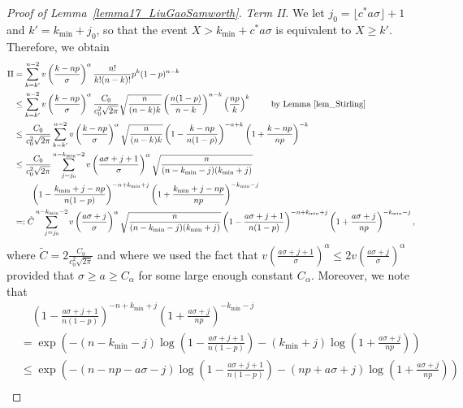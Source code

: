 \documentclass{article}
\begin{document}
\begin{proof}[Proof of Lemma~\ref{lemma17_LiuGaoSamworth}]
\textit{Term II.}
We let $j_0 = \lfloor c^* a \sigma\rfloor + 1$ and $k' = k_{\min} + j_0$, so that the event $X > k_{\min} + c^*a\sigma$ is equivalent to $X \geq k'$.
Therefore, we obtain
$$
\begin{aligned}
\text{II} &= \sum_{k = k'}^{n-2} v\left(\frac{k-np}{\sigma}\right)^\alpha \frac{n!}{k!(n-k)!} p^k (1-p)^{n-k}\\
&\leq \sum_{k = k'}^{n-2} v\left(\frac{k-np}{\sigma}\right)^\alpha \frac{C_0}{c_0^2\sqrt{2\pi}} \sqrt{\frac{n}{(n-k)k}} \left(\frac{n(1-p)}{n-k}\right)^{n-k} \left(\frac{np}{k}\right)^k\qquad \text{ by Lemma~\ref{lem_Stirling}}\\
& \leq \frac{C_0}{c_0^2\sqrt{2\pi}} \sum_{k = k'}^{n-2} v\left(\frac{k-np}{\sigma}\right)^\alpha \sqrt{\frac{n}{(n-k)k}} \left(1 - \frac{k-np}{n(1-p)}\right)^{-n+k} \left(1+ \frac{k-np}{np}\right)^{-k}\\
&\leq \frac{C_0}{c_0^2\sqrt{2\pi}} \sum_{j=j_0}^{n-k_{\min}-2} v\left(\frac{a\sigma + j + 1}{\sigma}\right)^\alpha \sqrt{\frac{n}{(n-k_{\min}-j)(k_{\min} + j)}} \\
& \qquad \left(1 - \frac{k_{\min} + j-np}{n(1-p)}\right)^{-n+k_{\min} + j} \left(1+ \frac{k_{\min} + j-np}{np}\right)^{-k_{\min} - j} \\
& =: \tilde C \sum_{j=j_0}^{n-k_{\min}-2} v\left(\frac{a\sigma + j}{\sigma}\right)^\alpha \sqrt{\frac{n}{(n-k_{\min}-j)(k_{\min} + j)}} \left(1 - \frac{a \sigma + j + 1}{n(1-p)}\right)^{-n+k_{\min} + j} \left(1+ \frac{a\sigma + j}{np}\right)^{-k_{\min} - j},
\end{aligned}
$$
where $\tilde C = 2\frac{C_0}{c_0^2\sqrt{2\pi}} $ and where we used the fact that $v\left(\frac{a\sigma + j + 1}{\sigma}\right)^\alpha  \leq 2 v\left(\frac{a\sigma + j}{\sigma}\right)^\alpha $
provided that $\sigma \geq a \geq C_\alpha$ for some large enough constant $C_\alpha$. 
Moreover, we note that
\begin{align*}
& \quad \left(1 - \frac{a \sigma + j + 1}{n(1-p)}\right)^{-n+k_{\min} + j} \left(1+ \frac{a\sigma + j}{np}\right)^{-k_{\min} - j} \\
& = \exp\left(-(n-k_{\min} - j) \log\left(1 - \frac{a \sigma + j + 1}{n(1-p)}\right) - (k_{\min} + j) \log\left(1 + \frac{a\sigma + j}{np}\right)\right)\\
& \leq \exp\left(-(n-np - a\sigma - j) \log\left(1 - \frac{a \sigma + j + 1}{n(1-p)}\right) - (np + a\sigma + j) \log\left(1 + \frac{a\sigma + j}{np}\right)\right)\\

\end{align*}
\end{proof}
\end{document}
